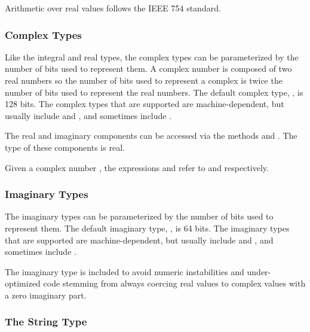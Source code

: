 Arithmetic over real values follows the IEEE 754 standard.

\subsubsection{Complex Types}
\label{Complex_Types}

Like the integral and real types, the complex types can be
parameterized by the number of bits used to represent them.  A complex
number is composed of two real numbers so the number of bits used to
represent a complex is twice the number of bits used to represent the
real numbers.  The default complex type, , is 128 bits.
The complex types that are supported are machine-dependent, but
usually include  and , and
sometimes include .

The real and imaginary components can be accessed via the methods
 and .  The type of these components is real.

\begin{example}
Given a complex number , the expressions
 and  refer to  and 
respectively.
\end{example}

\subsubsection{Imaginary Types}
\label{Imaginary_Types}

The imaginary types can be parameterized by the number of bits used to
represent them.  The default imaginary type, , is 64 bits.
The imaginary types that are supported are machine-dependent, but
usually include  and , and sometimes
include .

\begin{rationale}
The imaginary type is included to avoid numeric instabilities and
under-optimized code stemming from always coercing real values to
complex values with a zero imaginary part.
\end{rationale}

\subsubsection{The String Type}
\label{The_String_Type}


